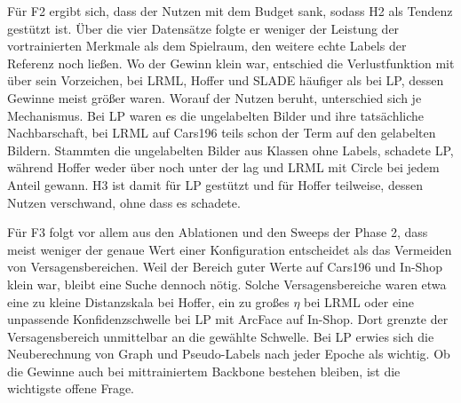 Für F2 ergibt sich, dass der Nutzen mit dem Budget sank, sodass H2 als Tendenz gestützt ist. Über die vier Datensätze folgte er weniger der Leistung der vortrainierten Merkmale als dem Spielraum, den weitere echte Labels der Referenz noch ließen. Wo der Gewinn klein war, entschied die Verlustfunktion mit über sein Vorzeichen, bei \ac{LRML}, Hoffer und \ac{SLADE} häufiger als bei \ac{LP}, dessen Gewinne meist größer waren. Worauf der Nutzen beruht, unterschied sich je Mechanismus. Bei \ac{LP} waren es die ungelabelten Bilder und ihre tatsächliche Nachbarschaft, bei \ac{LRML} auf Cars196 teils schon der Term auf den gelabelten Bildern. Stammten die ungelabelten Bilder aus Klassen ohne Labels, schadete \ac{LP}, während Hoffer weder über noch unter der \UEBL lag und \ac{LRML} mit Circle bei jedem Anteil gewann. H3 ist damit für \ac{LP} gestützt und für Hoffer teilweise, dessen Nutzen verschwand, ohne dass es schadete.

Für F3 folgt vor allem aus den Ablationen und den Sweeps der Phase 2, dass meist weniger der genaue Wert einer Konfiguration entscheidet als das Vermeiden von Versagensbereichen. Weil der Bereich guter Werte auf Cars196 und In-Shop klein war, bleibt eine Suche dennoch nötig. Solche Versagensbereiche waren etwa eine zu kleine Distanzskala bei Hoffer, ein zu großes $\eta$ bei \ac{LRML} oder eine unpassende Konfidenzschwelle bei \ac{LP} mit ArcFace auf In-Shop. Dort grenzte der Versagensbereich unmittelbar an die gewählte Schwelle. Bei \ac{LP} erwies sich die Neuberechnung von Graph und Pseudo-Labels nach jeder Epoche als wichtig. Ob die Gewinne auch bei mittrainiertem Backbone bestehen bleiben, ist die wichtigste offene Frage.
